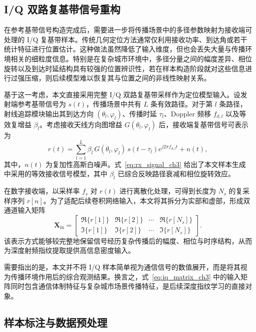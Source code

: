 \subsection{I/Q 双路复基带信号重构}
\label{subsec:3_2_2}

在参考基带信号构造完成后，需要进一步将传播场景中的多径参数映射为接收端可处理的 I/Q 复基带样本。传统几何定位方法通常仅利用接收功率、到达角或若干统计特征进行位置估计。这种做法虽然降低了输入维度，但也会丢失大量与传播环境相关的细粒度信息。特别是在复杂城市环境中，多径分量之间的幅度差异、相位旋转以及到达时延结构具有较强的位置辨识性，若在样本构造阶段就对这些信息进行过强压缩，则后续模型难以恢复其与位置之间的非线性映射关系。

基于这一考虑，本文直接采用完整 I/Q 双路复基带采样作为定位模型输入。设发射端参考基带信号为 \(s(t)\)，传播场景中共有 \(L\) 条有效路径。对于第 \(l\) 条路径，射线追踪模块输出其到达方向 \((\theta_l,\varphi_l)\)、传播时延 \(\tau_l\)、Doppler 频移 \(f_{d,l}\) 以及等效复增益 \(\beta_l\)。考虑接收天线方向图增益 \(G(\theta_l,\varphi_l)\) 后，接收端复基带信号可表示为
\begin{equation}
r(t)=\sum_{l=1}^{L}\beta_l\,G(\theta_l,\varphi_l)\,s(t-\tau_l)e^{j2\pi f_{d,l}t}+n(t),
\label{eq:rx_signal_ch3}
\end{equation}
其中，\(n(t)\) 为复加性高斯白噪声。式~\eqref{eq:rx_signal_ch3} 给出了本文样本生成中采用的等效接收信号模型，其中 \(\beta_l\) 已综合反映路径衰减和相位旋转效应。

在数字接收端，以采样率 \(f_s\) 对 \(r(t)\) 进行离散化处理，可得到长度为 \(N_s\) 的复采样序列 \(r[n]\)。为了适配后续卷积网络输入，本文将其拆分为实部和虚部，形成双通道输入矩阵
\begin{equation}
\mathbf{X}_{\mathrm{in}}=
\begin{bmatrix}
\Re\{r[1]\} & \Re\{r[2]\} & \cdots & \Re\{r[N_s]\} \\
\Im\{r[1]\} & \Im\{r[2]\} & \cdots & \Im\{r[N_s]\}
\end{bmatrix}.
\label{eq:iq_matrix_ch3}
\end{equation}
该表示方式能够较完整地保留信号经历复杂传播后的幅度、相位与时序结构，从而为深度射频指纹提取提供高信息密度输入。

需要指出的是，本文并不将 I/Q 样本简单视为通信信号的数值展开，而是将其视为传播环境作用后的综合观测结果。换言之，式~\eqref{eq:iq_matrix_ch3} 中的输入矩阵同时包含通信体制特征与复杂城市场景传播特征，是后续深度指纹学习的直接对象。

\subsection{样本标注与数据预处理}
\label{subsec:3_2_3}

